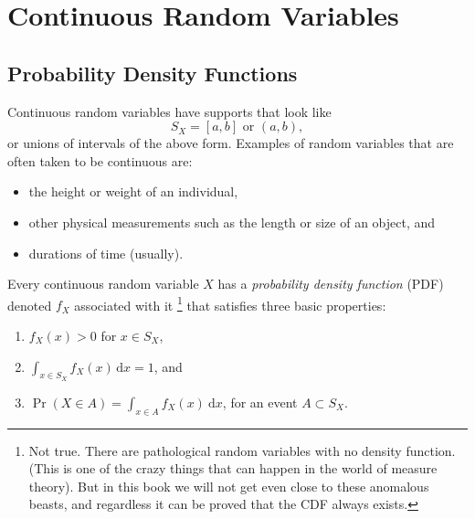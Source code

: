 \documentclass[captions=tableheading]{scrbook}
\begin{document}
\section{Continuous Random Variables}
\label{sec-6-1}
\label{sec-continuous-random-variables}
\subsection{Probability Density Functions}
\label{sec-6-1-1}
\label{sub-probability-density-functions}


Continuous random variables have supports that look like
\begin{equation}
S_{X}=[a,b]\mbox{ or }(a,b),
\end{equation}
or unions of intervals of the above form. Examples of random variables that are often taken to be continuous are:

\begin{itemize}
\item the height or weight of an individual,
\item other physical measurements such as the length or size of an object, and
\item durations of time (usually).
\end{itemize}

Every continuous random variable \(X\) has a \emph{probability density function} (PDF) denoted \(f_{X}\) associated with it
\footnote{Not true. There are pathological random variables with no density function. (This is one of the crazy things that can happen in the world of measure theory). But in this book we will not get even close to these anomalous beasts, and regardless it can be proved that the CDF always exists.}
that satisfies three basic properties:
\begin{enumerate}
\item \(f_{X}(x)>0\) for \(x\in S_{X}\),
\item \(\int_{x\in S_{X}}f_{X}(x)\,\mathrm{d} x=1\), and
\item \(\Pr(X\in A)=\int_{x\in A}f_{X}(x)\:\mathrm{d} x\), for an event \(A\subset S_{X}\).
\end{enumerate}
\end{document}
